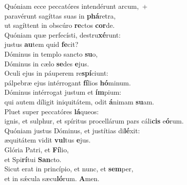 \evenverse Quóniam ecce peccatóres intendérunt arcum,~+\\\evenverse  paravérunt sagíttas suas in \textbf{phá}retra,~\*\\
\evenverse ut sagíttent in obscúro \textbf{re}ctos \textbf{cor}de.\\
\oddverse Quóniam quæ perfecísti, destru\textbf{xé}runt:~\*\\
\oddverse justus \textbf{au}tem quid \textbf{fe}cit?\\
\evenverse Dóminus in templo sancto \textbf{su}o,~\*\\
\evenverse Dóminus in cælo \textbf{se}des \textbf{e}jus.\\
\oddverse Oculi ejus in páuperem re\textbf{spí}ciunt:~\*\\
\oddverse pálpebræ ejus intérrogant \textbf{fí}lios \textbf{hó}minum.\\
\evenverse Dóminus intérrogat justum et \textbf{ím}pium:~\*\\
\evenverse qui autem díligit iniquitátem, odit \textbf{á}nimam \textbf{su}am.\\
\oddverse Pluet super peccatóres \textbf{lá}queos:~\*\\
\oddverse ignis, et sulphur, et spíritus procellárum pars cáli\textbf{cis} e\textbf{ó}rum.\\
\evenverse Quóniam justus Dóminus, et justítias di\textbf{lé}xit:~\*\\
\evenverse æquitátem vidit \textbf{vul}tus \textbf{e}jus.\\
\oddverse Glória Patri, et \textbf{Fí}lio,~\*\\
\oddverse et Spi\textbf{rí}tui \textbf{San}cto.\\
\evenverse Sicut erat in princípio, et nunc, et \textbf{sem}per,~\*\\
\evenverse et in sǽcula sæcu\textbf{ló}rum. \textbf{A}men.\\
